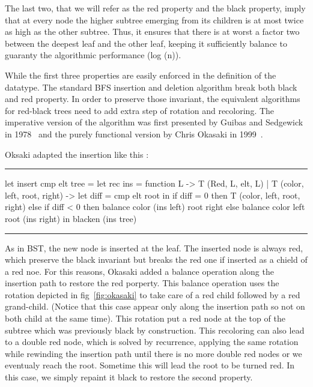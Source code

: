 \documentclass[10pt,a4paper]{article}
\newenvironment{codeblock}%
{\center \minipage{\textwidth} \vspace{6pt} \hrule \vspace{6pt} \minted{ocaml}}%
{\endminted \hrule \vspace{6pt} \endminipage \endcenter}
\begin{document}
The last two, that we will refer as the red property and the black property, imply that at every node the higher subtree emerging from its children is at most twice as high as the other subtree. Thus, it ensures that there is at worst a factor two between the deepest leaf and the other leaf, keeping it sufficiently balance to guaranty the algorithmic performance (log (n)).


While the first three properties are easily enforced in the definition of the datatype. The standard BFS insertion and deletion algorithm break both black and red property.
In order to preserve those invariant, the equivalent algorithms for red-black trees need to add extra step of rotation and recoloring.
The imperative version of the algorithm was first presented by Guibas and Sedgewick in 1978~\cite{guibas_1978} and the purely functional version by Chris Okasaki in 1999~\cite{okasaki_1999}.

Oksaki adapted the insertion like this :
\begin{codeblock}
   let insert cmp elt tree =
   let rec ins = function
   L -> T (Red, L, elt, L)
   | T (color, left, root, right) ->
   let diff = cmp elt root in
   if diff = 0 then T (color, left, root, right)
   else if diff < 0 then
   balance color (ins left) root right
   else
   balance color left root (ins right)
   in blacken (ins tree)
\end{codeblock}

As in BST, the new node is inserted at the leaf.
The inserted node is always red, which preserve the black invariant but breaks the red one if inserted as a chield of a red noe.
For this reasons, Okasaki added a balance operation along the insertion path to restore the red porperty. This balance operation uses the rotation depicted in fig~\ref{fig:okasaki} to take care of a red child followed by a red grand-child. (Notice that this case appear only along the insertion path so not on both child at the same time).
This rotation put a red node at the top of the subtree which was previously black by construction.
This recoloring can also lead to a double red node, which is solved by recurrence, applying the same rotation while rewinding the insertion path until there is no more double red nodes or we eventualy reach the root.
Sometime this will lead the root to be turned red. In this case, we simply repaint it black to restore the second property.
\end{document}
